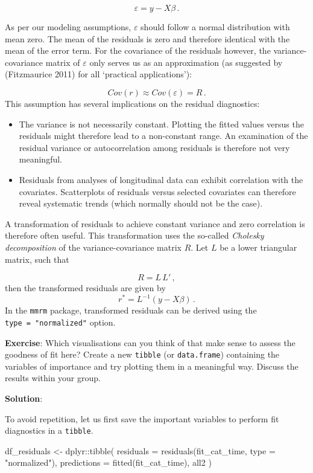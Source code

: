 \documentclass[
  letterpaper,
  DIV=11,
  numbers=noendperiod]{scrreprt}
\newenvironment{Shaded}{\begin{snugshade}}{\end{snugshade}}
\newcommand{\AttributeTok}[1]{\textcolor[rgb]{0.40,0.45,0.13}{#1}}
\newcommand{\FunctionTok}[1]{\textcolor[rgb]{0.28,0.35,0.67}{#1}}
\newcommand{\NormalTok}[1]{\textcolor[rgb]{0.00,0.23,0.31}{#1}}
\newcommand{\OtherTok}[1]{\textcolor[rgb]{0.00,0.23,0.31}{#1}}
\newcommand{\SpecialCharTok}[1]{\textcolor[rgb]{0.37,0.37,0.37}{#1}}
\newcommand{\StringTok}[1]{\textcolor[rgb]{0.13,0.47,0.30}{#1}}
\begin{document}
\[
\varepsilon = y - X\beta\,.
\]

As per our modeling assumptions, \(\varepsilon\) should follow a normal
distribution with mean zero. The mean of the residuals is zero and
therefore identical with the mean of the error term. For the covariance
of the residuals however, the variance-covariance matrix of
\(\varepsilon\) only serves us as an approximation (as suggested by
(Fitzmaurice 2011) for all `practical applications'):

\[
Cov(r) \approx Cov(\varepsilon) = R\,.
\] This assumption has several implications on the residual diagnostics:

\begin{itemize}
\item
  The variance is not necessarily constant. Plotting the fitted values
  versus the residuals might therefore lead to a non-constant range. An
  examination of the residual variance or autocorrelation among
  residuals is therefore not very meaningful.
\item
  Residuals from analyses of longitudinal data can exhibit correlation
  with the covariates. Scatterplots of residuals versus selected
  covariates can therefore reveal systematic trends (which normally
  should not be the case).
\end{itemize}

A transformation of residuals to achieve constant variance and zero
correlation is therefore often useful. This transformation uses the
so-called \emph{Cholesky decomposition} of the variance-covariance
matrix \(R\). Let \(L\) be a lower triangular matrix, such that

\[
R = L\,L'\,,
\] then the transformed residuals are given by \[
r^* =  L^{-1}(y - X\beta)\,.
\] In the \texttt{mmrm} package, transformed residuals can be derived
using the \texttt{type\ =\ "normalized"} option.

\textbf{Exercise}: Which visualisations can you think of that make sense
to assess the goodness of fit here? Create a new \texttt{tibble} (or
\texttt{data.frame}) containing the variables of importance and try
plotting them in a meaningful way. Discuss the results within your
group.

\textbf{Solution}:

To avoid repetition, let us first save the important variables to
perform fit diagnostics in a \texttt{tibble}.

\begin{Shaded}
\begin{Highlighting}[]
\NormalTok{df\_residuals }\OtherTok{\textless{}{-}}\NormalTok{ dplyr}\SpecialCharTok{::}\FunctionTok{tibble}\NormalTok{(}
  \AttributeTok{residuals =} \FunctionTok{residuals}\NormalTok{(fit\_cat\_time, }\AttributeTok{type =} \StringTok{"normalized"}\NormalTok{),}
  \AttributeTok{predictions =} \FunctionTok{fitted}\NormalTok{(fit\_cat\_time),}
\NormalTok{  all2}
\NormalTok{)}
\end{Highlighting}
\end{Shaded}
\end{document}
